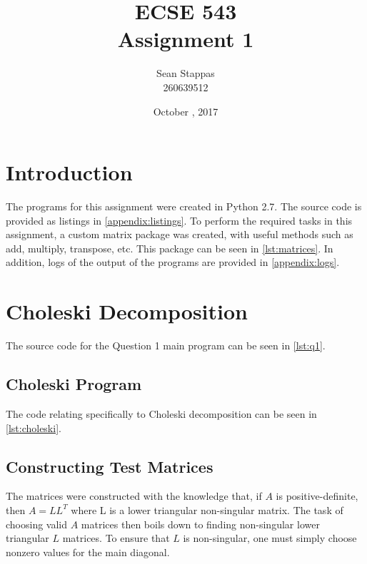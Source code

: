 \documentclass[a4paper,titlepage]{article}
\title{\textbf{ECSE 543 \\ Assignment 1}}
\author{Sean Stappas \\ 260639512}
\date{October \nth{17}, 2017}
\begin{document}
	\sloppy
	\maketitle
	\twocolumn
	
	\section*{Introduction}
	
	The programs for this assignment were created in Python 2.7. The source code is provided as listings in \autoref{appendix:listings}. To perform the required tasks in this assignment, a custom matrix package was created, with useful methods such as add, multiply, transpose, etc. This package can be seen in \autoref{lst:matrices}. In addition, logs of the output of the programs are provided in \autoref{appendix:logs}.
	
	\section{Choleski Decomposition}
	
	The source code for the Question 1 main program can be seen in \autoref{lst:q1}.
	
	\subsection{Choleski Program}
	
	The code relating specifically to Choleski decomposition can be seen in \autoref{lst:choleski}.
	
	
	\subsection{Constructing Test Matrices}
	
	The matrices were constructed with the knowledge that, if $A$ is positive-definite, then $A = LL^T$ where L is a lower triangular non-singular matrix. The task of choosing valid $A$ matrices then boils down to finding non-singular lower triangular $L$ matrices. To ensure that $L$ is non-singular, one must simply choose nonzero values for the main diagonal.
	
\end{document}

